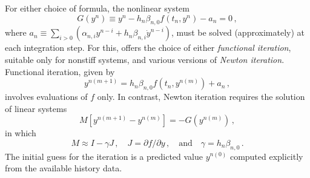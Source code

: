 For either choice of formula, the nonlinear system
\begin{equation}\label{e:nonlinear}
  G(y^n) \equiv y^n - h_n \beta_{n,0} f(t_n,y^n) - a_n = 0 \, ,
\end{equation}
where $a_n\equiv\sum_{i>0}(\alpha_{n,i}y^{n-i}+h_n\beta_{n,i} {\dot{y}}^{n-i})$, 
must be solved (approximately) at each integration step.  For this, {\cvode}
offers the choice of either {\em functional iteration}, suitable only
for nonstiff systems, and various versions of {\em Newton iteration}.
Functional iteration, given by
\[ y^{n(m+1)} = h_n \beta_{n,0} f(t_n,y^{n(m)}) + a_n \, , \]
involves evaluations of $f$ only.  In contrast, Newton iteration requires
the solution of linear systems
\begin{equation}\label{e:Newton}
  M [y^{n(m+1)} - y^{n(m)}] = -G(y^{n(m)}) \, ,
\end{equation}
in which
\begin{equation}\label{e:Newtonmat} 
  M \approx I - \gamma J \, ,
  \quad J = \partial f / \partial y \, ,
  \quad \mbox{and} \quad
  \gamma = h_n \beta_{n,0} \, . 
\end{equation}
The initial guess for the iteration is a predicted value $y^{n(0)}$
computed explicitly from the available history data.

